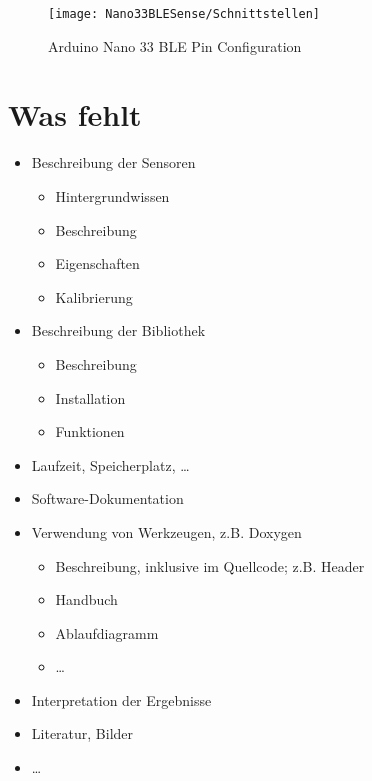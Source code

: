 \begin{figure}[ht]
    \centering
    \texttt{[image: Nano33BLESense/Schnittstellen]}
    \caption{Arduino Nano 33 BLE Pin Configuration}
    \label{Schnittstellen}
\end{figure}


\section{Was fehlt}

\begin{itemize}
  \item Beschreibung der Sensoren
    \begin{itemize}
      \item Hintergrundwissen
      \item Beschreibung
      \item Eigenschaften
      \item Kalibrierung
    \end{itemize}
  \item Beschreibung der Bibliothek
    \begin{itemize}
      \item Beschreibung
      \item Installation
      \item Funktionen
    \end{itemize}
  \item Laufzeit, Speicherplatz, \ldots
  \item Software-Dokumentation
  \item Verwendung von Werkzeugen, z.B. Doxygen
    \begin{itemize}
      \item Beschreibung, inklusive im Quellcode; z.B. Header
      \item Handbuch
      \item Ablaufdiagramm
      \item \ldots
\end{itemize}
\item Interpretation der Ergebnisse
\item Literatur, Bilder
\item \ldots
\end{itemize}


